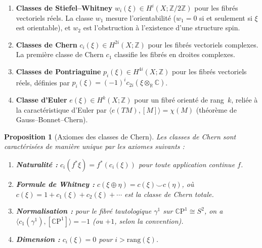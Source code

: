 \documentclass[12pt,a4paper,openany]{book}
\theoremstyle{definition}
\theoremstyle{plain}
\newtheorem{proposition}[definition]{Proposition}
\theoremstyle{remark}
\newcommand{\Z}{\mathbb{Z}}
\newcommand{\R}{\mathbb{R}}
\newcommand{\C}{\mathbb{C}}
\newcommand{\CP}{\mathbb{C}\mathrm{P}}
\begin{document}
\begin{enumerate}[label=(\roman*)]
  \item \textbf{Classes de Stiefel--Whitney}
        $w_i(\xi) \in H^i(X; \Z/2\Z)$ pour les fibrés vectoriels réels. La classe
        $w_1$ mesure l'orientabilité ($w_1 = 0$ si et seulement si $\xi$ est
        orientable), et $w_2$ est l'obstruction à l'existence d'une structure spin.

  \item \textbf{Classes de Chern}
        $c_i(\xi) \in H^{2i}(X; \Z)$ pour les fibrés vectoriels complexes.
        La première classe de Chern $c_1$ classifie les fibrés en droites complexes.

  \item \textbf{Classes de Pontriaguine}
        $p_i(\xi) \in H^{4i}(X; \Z)$ pour les fibrés vectoriels réels, définies par
        $p_i(\xi) = (-1)^i c_{2i}(\xi \otimes_{\R} \C)$.

  \item \textbf{Classe d'Euler}
        $e(\xi) \in H^k(X; \Z)$ pour un fibré orienté de rang~$k$, reliée à la
        caractéristique d'Euler par $\langle e(TM), [M] \rangle = \chi(M)$
        (théorème de Gauss--Bonnet--Chern).
\end{enumerate}

\begin{proposition}[Axiomes des classes de Chern]\label{prop:axiomes-chern}
  Les classes de Chern sont caractérisées de manière unique par les axiomes suivants :
  \begin{enumerate}[label=(\roman*)]
    \item \textbf{Naturalité :} $c_i(f^*\xi) = f^*(c_i(\xi))$ pour toute application
          continue $f$.
    \item \textbf{Formule de Whitney :}
          $c(\xi \oplus \eta) = c(\xi) \smile c(\eta)$, où
          $c(\xi) = 1 + c_1(\xi) + c_2(\xi) + \cdots$ est la \emph{classe de Chern
          totale}.
    \item \textbf{Normalisation :} pour le fibré tautologique $\gamma^1$ sur
          $\CP^1 \cong S^2$, on a $\langle c_1(\gamma^1), [\CP^1] \rangle = -1$
          (ou $+1$, selon la convention).
    \item \textbf{Dimension :} $c_i(\xi) = 0$ pour $i > \mathrm{rang}(\xi)$.
  \end{enumerate}
\end{proposition}
\end{document}
